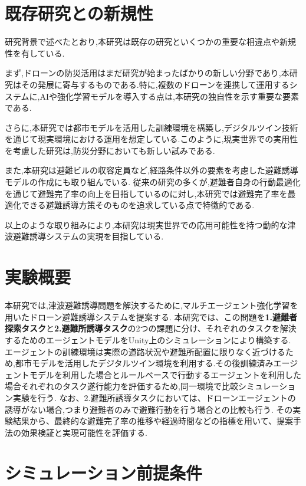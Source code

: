 \section{既存研究との新規性}  
研究背景で述べたとおり,本研究は既存の研究といくつかの重要な相違点や新規性を有している.

まず,ドローンの防災活用はまだ研究が始まったばかりの新しい分野であり,本研究はその発展に寄与するものである.特に,複数のドローンを連携して運用するシステムに,AIや強化学習モデルを導入する点は,本研究の独自性を示す重要な要素である.

さらに,本研究では都市モデルを活用した訓練環境を構築し,デジタルツイン技術を通じて現実環境における運用を想定している.このように,現実世界での実用性を考慮した研究は,防災分野においても新しい試みである.

また,本研究は避難ビルの収容定員など,経路条件以外の要素を考慮した避難誘導モデルの作成にも取り組んでいる.
従来の研究の多くが,避難者自身の行動最適化を通じて避難完了率の向上を目指しているのに対し,本研究では避難完了率を最適化できる避難誘導方策そのものを追求している点で特徴的である.

以上のような取り組みにより,本研究は現実世界での応用可能性を持つ動的な津波避難誘導システムの実現を目指している.

\section{実験概要}
本研究では,津波避難誘導問題を解決するために,マルチエージェント強化学習を用いたドローン避難誘導システムを提案する.
本研究では、この問題を\textbf{1.避難者探索タスク}と\textbf{2.避難所誘導タスク}の2つの課題に分け、それぞれのタスクを解決するためのエージェントモデルをUnity上のシミュレーションにより構築する.
エージェントの訓練環境は実際の道路状況や避難所配置に限りなく近づけるため,都市モデルを活用したデジタルツイン環境を利用する.その後訓練済みエージェントモデルを利用した場合とルールベースで行動するエージェントを利用した場合それぞれのタスク遂行能力を評価するため,同一環境で比較シミュレーション実験を行う.
なお、2.避難所誘導タスクにおいては、ドローンエージェントの誘導がない場合,つまり避難者のみで避難行動を行う場合との比較も行う.
その実験結果から、最終的な避難完了率の推移や経過時間などの指標を用いて、提案手法の効果検証と実現可能性を評価する.

\section{シミュレーション前提条件}
